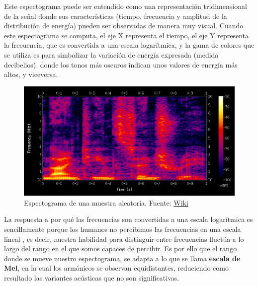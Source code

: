 \documentclass[11pt,a4paper,spanish]{book}
\begin{document}
	
	Este espectograma puede ser entendido como una representación tridimensional de la señal donde sus características (tiempo, frecuencia y amplitud de la distribución de energía) pueden ser observadas de manera muy visual. Cuando este espectograma se computa, el eje X representa el tiempo, el eje Y representa la frecuencia, que es convertida a una escala logarítmica, y la gama de colores que se utiliza es para simbolizar la variación de energía expresada (medida decibelios), donde los tonos más oscuros indican unos valores de energía más altos, y viceversa.
	
	\begin{figure}[h]
		\centering
		\includegraphics[scale=0.3]{spectogram.png} 
		\caption{Espectograma de una muestra aleatoria. Fuente: \href{https://es.other.wiki/wiki/Spectrogram}{Wiki}}
	\end{figure}
	
	La respuesta a por qué las frecuencias son convertidas a una escala logarítmica es sencillamente porque los humanos no percibimos las frecuencias en una escala lineal \cite{Varshney}, es decir, nuestra habilidad para distinguir entre frecuencias fluctúa a lo largo del rango en el que somos capaces de percibir\cite{StevensVolkmann}. Es por ello que el rango donde se mueve nuestro espectograma, se adapta a lo que se llama \textbf{escala de Mel}, en la cual los armónicos se observan equidistantes, reduciendo como resultado las variantes acústicas que no son significativas.\\
	
\end{document}
